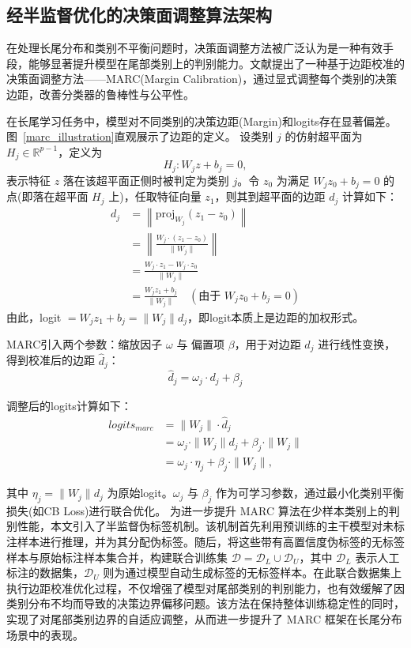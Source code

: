 \documentclass[master]{thesis-uestc}
\begin{document}
\subsection{经半监督优化的决策面调整算法架构}

在处理长尾分布和类别不平衡问题时，决策面调整方法被广泛认为是一种有效手段，能够显著提升模型在尾部类别上的判别能力。文献提出了一种基于边距校准的决策面调整方法——MARC(Margin Calibration)，通过显式调整每个类别的决策边距，改善分类器的鲁棒性与公平性。

在长尾学习任务中，模型对不同类别的决策边距(Margin)和logits存在显著偏差。图~\ref{marc_illustration}直观展示了边距的定义。
设类别 $j$ 的仿射超平面为 $H_j \in \mathbb{R}^{p-1}$，定义为
\[
H_j: W_j z + b_j = 0,
\]
表示特征 $z$ 落在该超平面正侧时被判定为类别 $j$。令 $z_0$ 为满足 $W_j z_0 + b_j = 0$ 的点(即落在超平面 $H_j$ 上)，任取特征向量 $z_1$，则其到超平面的边距 $d_j$ 计算如下：
\begin{equation}
    \begin{split}
        d_j &= \left\| \text{proj}_{W_j}(z_1 - z_0) \right\| \\
            &= \left\| \frac{W_j \cdot (z_1 - z_0)}{\|W_j\|} \right\| \\
            &= \frac{W_j \cdot z_1 - W_j \cdot z_0}{\|W_j\|} \\
            &= \frac{W_j z_1 + b_j}{\|W_j\|} \quad (\text{由于 } W_j z_0 + b_j = 0)
    \end{split}
\end{equation}
由此，logit $= W_j z_1 + b_j = \|W_j\| d_j$，即logit本质上是边距的加权形式。

MARC引入两个参数：缩放因子 $\omega$ 与 偏置项 $\beta$，用于对边距 $d_j$ 进行线性变换，得到校准后的边距 $\hat{d}_j$：
\begin{equation}
    \hat{d}_j = \omega_j \cdot d_j + \beta_j
\end{equation}

调整后的logits计算如下：
\begin{equation}
    \begin{split}
        logits_{marc} &= \| W_j \| \cdot \hat{d}_j \\
                      &= \omega_j \cdot \|W_j\| d_j + \beta_j \cdot \|W_j\| \\
                      &= \omega_j \cdot \eta_j + \beta_j \cdot \|W_j\|,
    \end{split}
\end{equation}

其中 $\eta_j = \|W_j\| d_j$ 为原始logit。$\omega_j$ 与 $\beta_j$ 作为可学习参数，通过最小化类别平衡损失(如CB Loss)进行联合优化。
为进一步提升 MARC 算法在少样本类别上的判别性能，本文引入了半监督伪标签机制。该机制首先利用预训练的主干模型对未标注样本进行推理，并为其分配伪标签。随后，将这些带有高置信度伪标签的无标签样本与原始标注样本集合并，构建联合训练集 $\mathcal{D} = \mathcal{D}_L \cup \mathcal{D}_U$，其中 $\mathcal{D}_L$ 表示人工标注的数据集，$\mathcal{D}_U$ 则为通过模型自动生成标签的无标签样本。在此联合数据集上执行边距校准优化过程，不仅增强了模型对尾部类别的判别能力，也有效缓解了因类别分布不均而导致的决策边界偏移问题。该方法在保持整体训练稳定性的同时，实现了对尾部类别边界的自适应调整，从而进一步提升了 MARC 框架在长尾分布场景中的表现。
\end{document}
